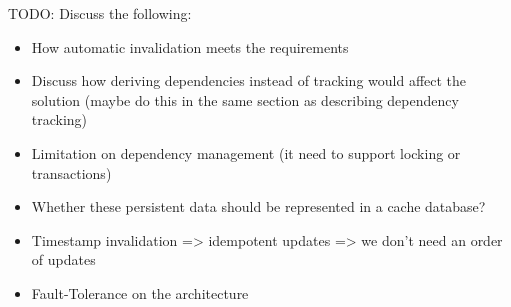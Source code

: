 TODO: Discuss the following:

\begin{itemize}
  \item How automatic invalidation meets the requirements
  \item Discuss how deriving dependencies instead of tracking would affect the solution (maybe do this in the same section as describing dependency tracking)
  \item Limitation on dependency management (it need to support locking or transactions)
  \item Whether these persistent data should be represented in a cache database?
  \item Timestamp invalidation => idempotent updates => we don't need an order of updates
  \item Fault-Tolerance on the architecture
\end{itemize}










